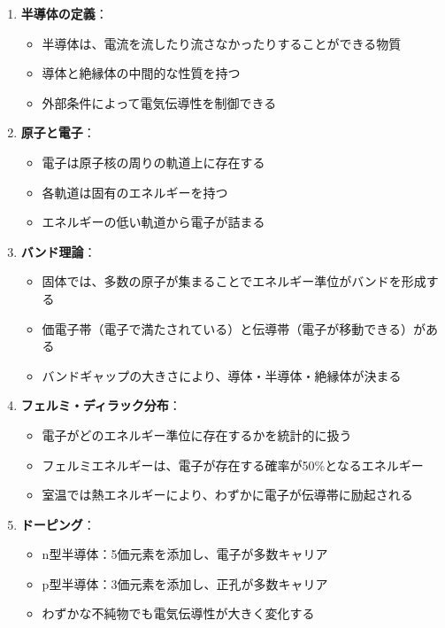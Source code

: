 \begin{enumerate}
\item \textbf{半導体の定義}：
\begin{itemize}
\item 半導体は、電流を流したり流さなかったりすることができる物質
\item 導体と絶縁体の中間的な性質を持つ
\item 外部条件によって電気伝導性を制御できる
\end{itemize}

\item \textbf{原子と電子}：
\begin{itemize}
\item 電子は原子核の周りの軌道上に存在する
\item 各軌道は固有のエネルギーを持つ
\item エネルギーの低い軌道から電子が詰まる
\end{itemize}

\item \textbf{バンド理論}：
\begin{itemize}
\item 固体では、多数の原子が集まることでエネルギー準位がバンドを形成する
\item 価電子帯（電子で満たされている）と伝導帯（電子が移動できる）がある
\item バンドギャップの大きさにより、導体・半導体・絶縁体が決まる
\end{itemize}

\item \textbf{フェルミ・ディラック分布}：
\begin{itemize}
\item 電子がどのエネルギー準位に存在するかを統計的に扱う
\item フェルミエネルギーは、電子が存在する確率が50\%となるエネルギー
\item 室温では熱エネルギーにより、わずかに電子が伝導帯に励起される
\end{itemize}

\item \textbf{ドーピング}：
\begin{itemize}
\item n型半導体：5価元素を添加し、電子が多数キャリア
\item p型半導体：3価元素を添加し、正孔が多数キャリア
\item わずかな不純物でも電気伝導性が大きく変化する
\end{itemize}


\end{enumerate}

